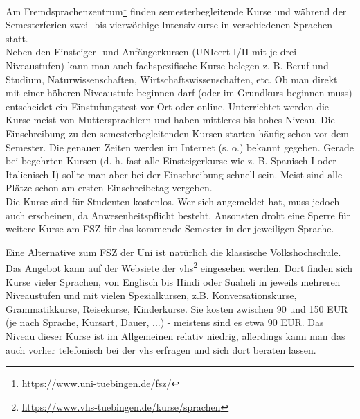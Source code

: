 Am Fremdsprachenzentrum\footnote{\url{https://www.uni-tuebingen.de/fsz/}} finden semesterbegleitende Kurse und während der Semesterferien zwei- bis vierwöchige Intensivkurse in verschiedenen Sprachen statt.\\
Neben den Einsteiger- und Anfängerkursen (UNIcert I/II mit je drei Niveaustufen) kann man auch fachspezifische Kurse belegen z. B. Beruf und Studium, Naturwissenschaften, Wirtschaftswissenschaften, etc.  Ob man direkt mit einer höheren Niveaustufe beginnen darf (oder im Grundkurs beginnen muss) entscheidet ein Einstufungstest vor Ort oder online.  Unterrichtet werden die Kurse meist von Muttersprachlern und haben mittleres bis hohes Niveau.
Die Einschreibung zu den semesterbegleitenden Kursen starten häufig schon vor dem Semester. Die genauen Zeiten werden im Internet (s. o.) bekannt gegeben.  Gerade bei begehrten Kursen (d. h. fast alle Einsteigerkurse wie z. B. Spanisch I oder Italienisch I) sollte man aber bei der  Einschreibung schnell sein. Meist sind alle Plätze schon am ersten Einschreibetag vergeben.\\
Die Kurse sind für Studenten kostenlos. Wer sich angemeldet hat, muss jedoch auch erscheinen, da Anwesenheitspflicht besteht. Ansonsten droht eine Sperre für weitere Kurse am FSZ für das kommende Semester in der jeweiligen Sprache.
  
Eine Alternative zum FSZ der Uni ist natürlich die klassische Volkshochschule. Das Angebot kann auf der Websiete der vhs\footnote{\url{https://www.vhs-tuebingen.de/kurse/sprachen}} eingesehen werden. Dort finden sich Kurse vieler Sprachen, von Englisch bis Hindi oder Suaheli in jeweils mehreren Niveaustufen und mit vielen Spezialkursen, z.B. Konversationskurse, Grammatikkurse, Reisekurse, Kinderkurse. Sie kosten zwischen 90 und 150 EUR (je nach Sprache, Kursart, Dauer, ...) - meistens sind es etwa 90 EUR. Das Niveau dieser Kurse ist im Allgemeinen relativ niedrig, allerdings kann man das auch vorher telefonisch bei der vhs erfragen und sich dort beraten lassen.

\vfill
